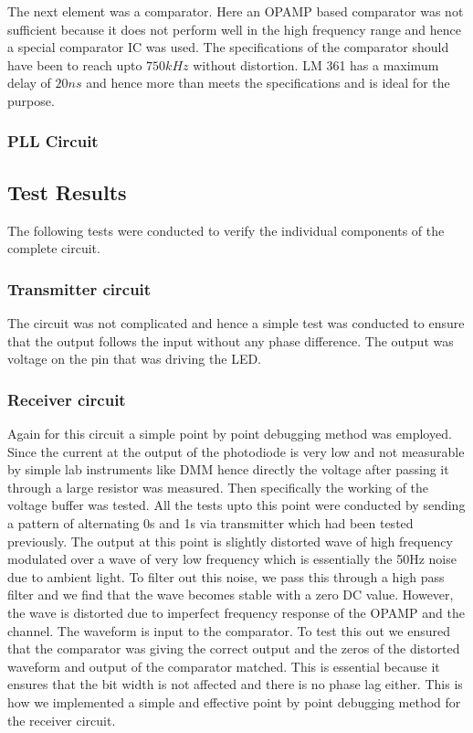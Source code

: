 \documentclass{article}
\begin{document}
The next element was a comparator. Here an OPAMP based comparator was not sufficient because it does not perform well in the high frequency range and hence a special comparator IC was used. The specifications of the comparator should have been to reach upto $ 750 kHz $ without distortion. LM 361 has a maximum delay of $20 ns$ and hence more than meets the specifications and is ideal for the purpose.

\subsubsection{PLL Circuit}

\subsection{Test Results}
The following tests were conducted to verify the individual components of the complete circuit.
\subsubsection{Transmitter circuit}
The circuit was not complicated and hence a simple test was conducted to ensure that the output follows the input without any phase difference. The output was voltage on the pin that was driving the LED.
\subsubsection{Receiver circuit}
Again for this circuit a simple point by point debugging method was employed. Since the current at the output of the photodiode is very low and not measurable by simple lab instruments like DMM hence directly the voltage after passing it through a large resistor was measured. Then specifically the working of the voltage buffer was tested. All the tests upto this point were conducted by sending a pattern of alternating 0s and 1s via transmitter which had been tested previously. The output at this point is slightly distorted wave of high frequency modulated over a wave of very low frequency which is essentially the 50Hz noise due to ambient light. To filter out this noise, we pass this through a high pass filter and we find that the wave becomes stable with a zero DC value. However, the wave is distorted due to imperfect frequency response of the OPAMP and the channel. The waveform is input to the comparator. To test this out we ensured that the comparator was giving the correct output and the zeros of the distorted waveform and output of the comparator matched. This is essential because it ensures that the bit width is not affected and there is no phase lag either. This is how we implemented a simple and effective point by point debugging method for the receiver circuit.
\end{document}
